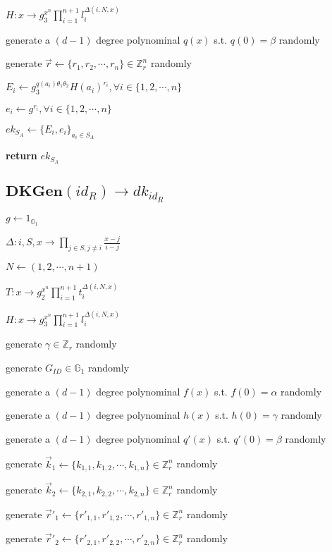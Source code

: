\documentclass[a4paper]{article}
\begin{document}
$H: x \rightarrow g_3^{x^n} \prod\limits_{i = 1}^{n + 1} l_i^{\Delta(i, N, x)}$

generate a $(d - 1)$ degree polynominal $q(x)$ s.t. $q(0) = \beta$ randomly

generate $\vec{r} \gets \{r_1, r_2, \cdots, r_n\} \in \mathbb{Z}_r^n$ randomly

$E_i \gets g_3^{q(a_i) \theta_1 \theta_2} H(a_i)^{r_i}, \forall i \in \{1, 2, \cdots, n\}$

$e_i \gets g^{r_i}, \forall i \in \{1, 2, \cdots, n\}$

$\textit{ek}_{S_A} \gets \{E_i, e_i\}_{a_i \in S_A}$

\textbf{return} $\textit{ek}_{S_A}$

\subsection{$\textbf{DKGen}(\textit{id}_R) \rightarrow \textit{dk}_{\textit{id}_R}$}

$g \gets 1_{\mathbb{G}_1}$

$\Delta: i, S, x \rightarrow \prod\limits_{j \in S, j \neq i} \frac{x - j}{i - j}$

$N \gets (1, 2, \cdots, n + 1)$

$T: x \rightarrow g_2^{x^n} \prod\limits_{i = 1}^{n + 1} t_i^{\Delta(i, N, x)}$

$H: x \rightarrow g_3^{x^n} \prod\limits_{i = 1}^{n + 1} l_i^{\Delta(i, N, x)}$

generate $\gamma \in \mathbb{Z}_r$ randomly

generate $G_{\textit{ID}} \in \mathbb{G}_1$ randomly

generate a $(d - 1)$ degree polynominal $f(x)$ s.t. $f(0) = \alpha$ randomly

generate a $(d - 1)$ degree polynominal $h(x)$ s.t. $h(0) = \gamma$ randomly

generate a $(d - 1)$ degree polynominal $q'(x)$ s.t. $q'(0) = \beta$ randomly

generate $\vec{k}_1 \gets \{k_{1, 1}, k_{1, 2}, \cdots, k_{1, n}\} \in \mathbb{Z}_r^n$ randomly

generate $\vec{k}_2 \gets \{k_{2, 1}, k_{2, 2}, \cdots, k_{2, n}\} \in \mathbb{Z}_r^n$ randomly

generate $\vec{r}'_1 \gets \{r'_{1, 1}, r'_{1, 2}, \cdots, r'_{1, n}\} \in \mathbb{Z}_r^n$ randomly

generate $\vec{r}'_2 \gets \{r'_{2, 1}, r'_{2, 2}, \cdots, r'_{2, n}\} \in \mathbb{Z}_r^n$ randomly
\end{document}
